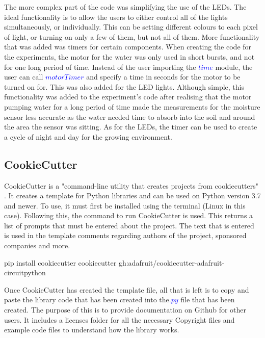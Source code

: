 The more complex part of the code was simplifying the use of the LEDs. The ideal functionality is to allow the users to either control all of the lights simultaneously, or individually. This can be setting different colours to each pixel of light, or turning on only a few of them, but not all of them. More functionality that was added was timers for certain components. When creating the code for the experiments, the motor for the water was only used in short bursts, and not for one long period of time. Instead of the user importing the \textcolor{blue}{$time$} module, the user can call \textcolor{blue}{$motorTimer$} and specify a time in seconds for the motor to be turned on for. This was also added for the LED lights. Although simple, this functionality was added to the experiment's code after realising that the motor pumping water for a long period of time made the measurements for the moisture sensor less accurate as the water needed time to absorb into the soil and around the area the sensor was sitting. As for the LEDs, the timer can be used to create a cycle of night and day for the growing environment. 

\subsection{CookieCutter}

CookieCutter is a "command-line utility that creates projects from cookiecutters" \cite{cookiecutter}. It creates a template for Python libraries and can be used on Python version 3.7 and newer. To use, it must first be installed using the terminal (Linux in this case). Following this, the command to run CookieCutter is used. This returns a list of prompts that must be entered about the project. The text that is entered is used in the template comments regarding authors of the project, sponsored companies and more.

\begin{python}[caption={Installing CookieCutter on Linux}, captionpos=b]
    pip install cookiecutter
    cookiecutter gh:adafruit/cookiecutter-adafruit-circuitpython
\end{python}

Once CookieCutter has created the template file, all that is left is to copy and paste the library code that has been created into the\textcolor{blue}{$.py$} file that has been created. The purpose of this is to provide documentation on Github for other users. It includes a licenses folder for all the necessary Copyright files and example code files to understand how the library works.

